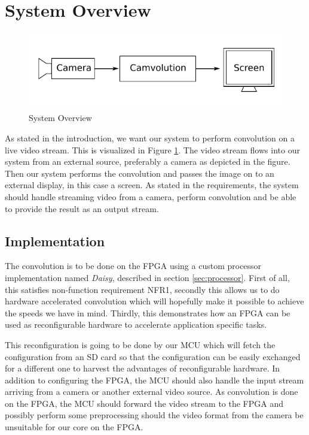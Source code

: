 \section{System Overview}


\begin{figure}[h]
    \centering
    \includegraphics{img/SystemOverview.pdf}
    \caption{System Overview}
    \label{fig:SystemOverview}
\end{figure}

As stated in the introduction, we want our system to perform convolution on a live video stream.
This is visualized in Figure \ref{fig:SystemOverview}.
The video stream flows into our system from an external source, preferably a camera as depicted in the figure.
Then our system performs the convolution and passes the image on to an external display, in this case a screen.
As stated in the requirements, the system should handle streaming video from a camera, perform convolution and be able to provide the result as an output stream.

\subsection{Implementation}
The convolution is to be done on the FPGA using a custom processor implementation named \textit{Daisy}, described in section \ref{sec:processor}.
First of all, this satisfies non-function requirement NFR1, secondly this allows us to do hardware accelerated convolution which will hopefully make it possible to achieve the speeds we have in mind.
Thirdly, this demonstrates how an FPGA can be used as reconfigurable hardware to accelerate application specific tasks.

This reconfiguration is going to be done by our MCU which will fetch the configuration from an SD card so that the configuration can be easily exchanged for a different one to harvest the advantages of reconfigurable hardware.
In addition to configuring the FPGA, the MCU should also handle the input stream arriving from a camera or another external video source.
As convolution is done on the FPGA, the MCU should forward the video stream to the FPGA and possibly perform some preprocessing should the video format from the camera be unsuitable for our core on the FPGA.

